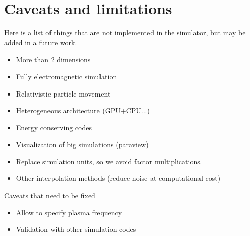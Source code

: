\chapter{Caveats and limitations}

Here is a list of things that are not implemented in the simulator, but may be 
added in a future work.

\begin{itemize}
\item More than 2 dimensions
\item Fully electromagnetic simulation
\item Relativistic particle movement
\item Heterogeneous architecture (GPU+CPU...)
\item Energy conserving codes
\item Visualization of big simulations (paraview)
\item Replace simulation units, so we avoid factor multiplications
\item Other interpolation methods (reduce noise at computational cost)
\end{itemize}
%
Caveats that need to be fixed
%
\begin{itemize}
\item Allow to specify plasma frequency
\item Validation with other simulation codes
\end{itemize}

